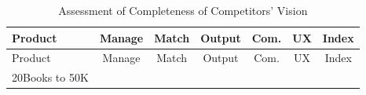 \documentclass[10pt,openany]{book}
\begin{document}
\newpage

\begin{longtable}[]{@{}lcccccc@{}}
\caption{Assessment of Completeness of Competitors'
Vision}\tabularnewline
\toprule
\begin{minipage}[b]{0.29\columnwidth}\raggedright
Product\strut
\end{minipage} & \begin{minipage}[b]{0.09\columnwidth}\centering
Manage\strut
\end{minipage} & \begin{minipage}[b]{0.08\columnwidth}\centering
Match\strut
\end{minipage} & \begin{minipage}[b]{0.09\columnwidth}\centering
Output\strut
\end{minipage} & \begin{minipage}[b]{0.07\columnwidth}\centering
Com.\strut
\end{minipage} & \begin{minipage}[b]{0.10\columnwidth}\centering
UX\strut
\end{minipage} & \begin{minipage}[b]{0.10\columnwidth}\centering
Index\strut
\end{minipage}\tabularnewline
\midrule
\endfirsthead
\toprule
\begin{minipage}[b]{0.29\columnwidth}\raggedright
Product\strut
\end{minipage} & \begin{minipage}[b]{0.09\columnwidth}\centering
Manage\strut
\end{minipage} & \begin{minipage}[b]{0.08\columnwidth}\centering
Match\strut
\end{minipage} & \begin{minipage}[b]{0.09\columnwidth}\centering
Output\strut
\end{minipage} & \begin{minipage}[b]{0.07\columnwidth}\centering
Com.\strut
\end{minipage} & \begin{minipage}[b]{0.10\columnwidth}\centering
UX\strut
\end{minipage} & \begin{minipage}[b]{0.10\columnwidth}\centering
Index\strut
\end{minipage}\tabularnewline
\midrule
\endhead
\begin{minipage}[t]{0.29\columnwidth}\raggedright
20Books to 50K\strut
\end{minipage} & \begin{minipage}[t]{0.09\columnwidth}\centering

\end{minipage}
\end{longtable}
\end{document}

